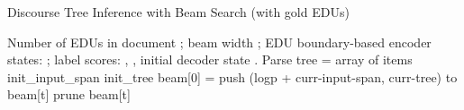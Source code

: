 \begin{algorithm}[t!]
\scriptsize
\captionsetup{font=scriptsize}
    \caption{Discourse Tree Inference with Beam Search (with gold EDUs)}
    \label{alg1}
    \begin{algorithmic}
    \REQUIRE Number of EDUs in document ; beam width ; EDU boundary-based encoder states: ; label scores: , , initial decoder state .
    \ENSURE Parse tree 
\STATE  {}
     = array of  items            
    \STATE init\_input\_span 
    \STATE init\_tree 
    \STATE beam{[0]} =  
    \FOR {}
        \FOR {} 
            \STATE  {}
            \STATE  {}
            \FOR {}
                \STATE 
                \STATE 
                \STATE 
                \IF{}    
                    \STATE 
                \ENDIF
                \IF{}    
                    \STATE 
                \ENDIF
                \STATE push ({logp} +  {curr-input-span}, {curr-tree}) to beam[t]
            \ENDFOR
        \ENDFOR
        \STATE prune beam[t] 
    \ENDFOR
    \STATE  {}
    \STATE 
  \end{algorithmic}
\label{alg:parsing-with-EDUs}
\end{algorithm}

